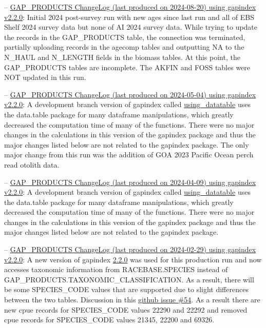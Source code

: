 \documentclass[
  letterpaper,
  oneside,
  open=any]{scrbook}
\begin{document}
--
\href{https://raw.githubusercontent.com/afsc-gap-products/gap_products/main/content/intro-news/2024-08-20.txt}{GAP\_PRODUCTS
ChangeLog (last produced on 2024-08-20) using gapindex v2.2.0}: Initial
2024 post-survey run with new ages since last run and all of EBS Shelf
2024 survey data but none of AI 2024 survey data. While trying to update
the records in the GAP\_PRODUCTS table, the connection was terminated,
partially uploading records in the agecomp tables and outputting NA to
the N\_HAUL and N\_LENGTH fields in the biomass tables. At this point,
the GAP\_PRODUCTS tables are incomplete. The AKFIN and FOSS tables were
NOT updated in this run.

--
\href{https://raw.githubusercontent.com/afsc-gap-products/gap_products/main/content/intro-news/2024-05-04.txt}{GAP\_PRODUCTS
ChangeLog (last produced on 2024-05-04) using gapindex v2.2.0}: A
development branch version of gapindex called
\href{https://github.com/afsc-gap-products/gap_products/tree/using_datatable}{using\_datatable}
uses the data.table package for many dataframe manipulations, which
greatly decreased the computation time of many of the functions. There
were no major changes in the calculations in this version of the
gapindex package and thus the major changes listed below are not related
to the gapindex package. The only major change from this run was the
addition of GOA 2023 Pacific Ocean perch read otolith data.

--
\href{https://raw.githubusercontent.com/afsc-gap-products/gap_products/main/content/intro-news/2024-04-09.txt}{GAP\_PRODUCTS
ChangeLog (last produced on 2024-04-09) using gapindex v2.2.0}: A
development branch version of gapindex called
\href{https://github.com/afsc-gap-products/gap_products/tree/using_datatable}{using\_datatable}
uses the data.table package for many dataframe manipulations, which
greatly decreased the computation time of many of the functions. There
were no major changes in the calculations in this version of the
gapindex package and thus the major changes listed below are not related
to the gapindex package.

--
\href{https://raw.githubusercontent.com/afsc-gap-products/gap_products/main/content/intro-news/2024-02-29.txt}{GAP\_PRODUCTS
ChangeLog (last produced on 2024-02-29) using gapindex v2.2.0}: A new
version of gapindex
\href{https://github.com/afsc-gap-products/gapindex/releases/tag/v2.2.0}{2.2.0}
was used for this production run and now accesses taxonomic information
from RACEBASE.SPECIES instead of
GAP\_PRODUCTS.TAXONOMIC\_CLASSIFICATION. As a result, there will be some
SPECIES\_CODE values that are supported due to slight differences
between the two tables. Discussion in this
\href{https://github.com/afsc-gap-products/gapindex/issues/54}{github
issue \#54}. As a result there are new cpue records for SPECIES\_CODE
values 22290 and 22292 and removed cpue records for SPECIES\_CODE values
21345, 22200 and 69326.
\end{document}
